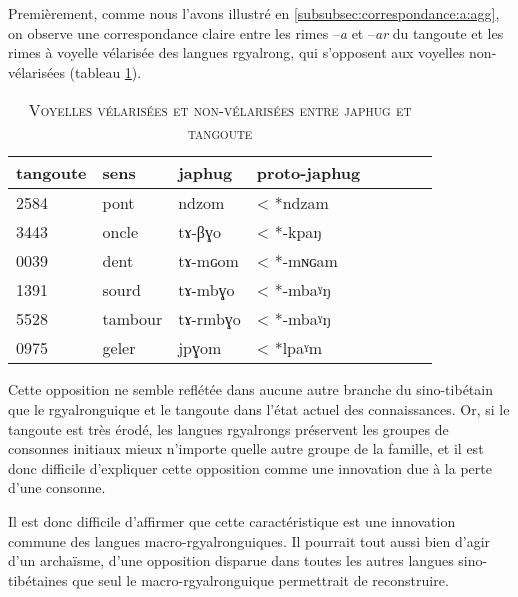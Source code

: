 \documentclass[oldfontcommands,twoside,a4paper,11pt,draft]{memoir}
\newcommand{\captionb}[1]{\caption{\textsc{#1}}}
\newcommand{\tgz}[1]{#1 \mo{#1} \tg{#1}}
\begin{document}
Premièrement, comme nous l'avons illustré en \ref{subsubsec:correspondance:a:agg}, on observe une correspondance claire entre les rimes --\textit{a} et --\textit{ar} du tangoute et les rimes à voyelle vélarisée des langues rgyalrong, qui s'opposent aux voyelles non-vélarisées (tableau \ref{tab:velarisee.tangoute}).
\begin{table}
\captionb{Voyelles vélarisées et non-vélarisées entre japhug et tangoute} \label{tab:velarisee.tangoute}
\begin{tabular}{llllllll}
\toprule
tangoute & sens & japhug & proto-japhug\\
\midrule
\tgz{2584} &   			pont   &  	ndzom    &  	< *ndzam   \\  
\tgz{3443} &   			oncle   &  	tɤ-βɣo    &  	< *-kpaŋ   \\  
\tgz{0039} &   			dent   &  	tɤ-mɢom    &  	< *-mɴɢam   \\  
\midrule
\tgz{1391} &   			sourd   &  	tɤ-mbɣo    &  	< *-mbaˠŋ   \\  
\tgz{5528} &   			tambour   &  	tɤ-rmbɣo    &  	< *-mbaˠŋ   \\  
\tgz{0975} &   			geler   &  	jpɣom    &  	< *lpaˠm   \\  
\bottomrule
\end{tabular}
 \end{table}
Cette opposition ne semble   reflétée dans aucune autre branche du sino-tibétain que le rgyalronguique et le tangoute dans l'état actuel des connaissances. Or, si le tangoute est très érodé, les langues rgyalrongs préservent les groupes de consonnes initiaux mieux n'importe quelle autre groupe de la famille, et il est donc difficile d'expliquer cette opposition comme une innovation due à la perte d'une consonne.
 
 Il est donc  difficile d'affirmer que cette caractéristique est une innovation commune des langues macro-rgyalronguiques. Il pourrait tout aussi bien d'agir d'un archaïsme, d'une opposition disparue dans toutes les autres langues sino-tibétaines que seul le macro-rgyalronguique permettrait de reconstruire.
 
\end{document}
